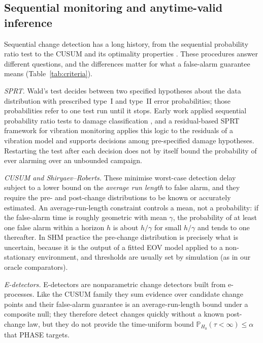 \documentclass[12pt,a4paper]{article}
\newcommand{\rev}[1]{#1}
\newenvironment{revblock}{}{}
\newcommand{\rev}[1]{{\color{revcol}#1}}
\newenvironment{revblock}{\begingroup\color{revcol}}{\endgroup}
\newcommand{\Prob}{\mathbb{P}}
\begin{document}
\subsection{Sequential monitoring and anytime-valid inference}\label{sec:related-seq}

Sequential change detection has a long history, from the sequential probability ratio test \citep{wald1945sequential} to the CUSUM \citep{page1954cusum} and its optimality properties \citep{lorden1971procedures,moustakides1986optimal,pollak1985optimal}. \rev{These procedures answer different questions, and the differences matter for what a false-alarm guarantee means (Table~\ref{tab:criteria}).}

\begin{revblock}
\noindent\emph{SPRT.} Wald's test decides between two specified hypotheses about the data distribution with prescribed type~I and type~II error probabilities; those probabilities refer to one test run until it stops. Early work applied sequential probability ratio tests to damage classification \citep{sohn2003sprt}, and a residual-based SPRT framework for vibration monitoring \citep{kopsaftopoulos2015sprt} applies this logic to the residuals of a vibration model and supports decisions among pre-specified damage hypotheses. Restarting the test after each decision does not by itself bound the probability of ever alarming over an unbounded campaign.

\noindent\emph{CUSUM and Shiryaev--Roberts.} These minimise worst-case detection delay subject to a lower bound on the \emph{average run length} to false alarm, and they require the pre- and post-change distributions to be known or accurately estimated. An average-run-length constraint controls a mean, not a probability: if the false-alarm time is roughly geometric with mean $\gamma$, the probability of at least one false alarm within a horizon $h$ is about $h/\gamma$ for small $h/\gamma$ and tends to one thereafter. In SHM practice the pre-change distribution is precisely what is uncertain, because it is the output of a fitted EOV model applied to a non-stationary environment, and thresholds are usually set by simulation (as in our oracle comparators).

\noindent\emph{E-detectors.} E-detectors \citep{shin2023edetectors} are nonparametric change detectors built from e-processes. Like the CUSUM family they sum evidence over candidate change points and their false-alarm guarantee is an average-run-length bound under a composite null; they therefore detect changes quickly without a known post-change law, but they do not provide the time-uniform bound $\Prob_{H_0}(\tau<\infty)\le\alpha$ that PHASE targets.


\end{revblock}
\end{document}

